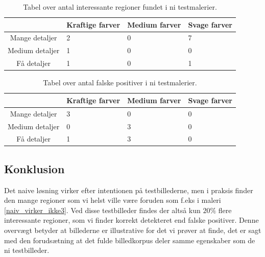 \begin{table}[H]
    \centering
    \begin{tabular}{|c|l|l|l|}
			\hline
            & Kraftige farver & Medium farver & Svage farver \\\hline
		Mange detaljer	& 2 & 0 & 7 \\\hline
        Medium detaljer  & 1 & 0 & 0 \\\hline
        Få detaljer     & 1 & 0 & 1 \\\hline
    \end{tabular}
    \caption[]{Tabel over antal interessante regioner fundet i ni testmalerier.}
    \label{naiv_good}
\end{table}

\begin{table}[H]
    \centering
    \begin{tabular}{|c|l|l|l|}
			\hline
            & Kraftige farver & Medium farver & Svage farver \\\hline
		Mange detaljer	& 3 & 0 & 0 \\\hline
        Medium detaljer  & 0 & 3 & 0 \\\hline
        Få detaljer     & 1 & 3 & 0 \\\hline
    \end{tabular}
    \caption[]{Tabel over antal falske positiver i ni testmalerier.}
    \label{naiv_bad}
\end{table}

\subsection{Konklusion}
Det naive løsning virker efter intentionen på testbillederne, men i
praksis finder den mange regioner som vi helst
ville være foruden som f.eks i maleri \ref{naiv_virker_ikke3}. 
Ved disse testbilleder findes der altså kun $20\%$ flere interessante
regioner, som vi finder korrekt detekteret end falske positiver. 
Denne overvægt betyder at billederne er illustrative for det vi prøver
at finde, det er sagt med den forudsætning at det fulde billedkorpus
deler samme egenskaber som de ni testbilleder.
